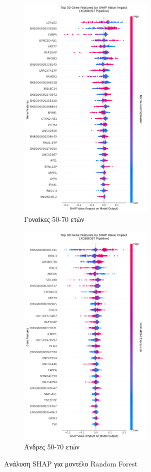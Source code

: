 \documentclass[12pt]{report}
\begin{document}
            \begin{figure}[ht]
                \centering
                \begin{subfigure}[b]{0.45\textwidth}
                    \centering
                    \includegraphics[height=11cm,width=\textwidth,keepaspectratio]{ML/Predict/DEG/SHAP/XGBoost/shap_beeswarm_plot_Female_50-70_useSMOTE_False.png}
                    \caption{Γυναίκες 50-70 ετών}
                    \label{fig:shap_beeswarm_XGB_plot_Female_50-70_useSMOTE_False}
                \end{subfigure}
                \hfill
                \begin{subfigure}[b]{0.45\textwidth}
                    \centering
                    \includegraphics[height=11cm,width=\textwidth,keepaspectratio]{ML/Predict/DEG/SHAP/XGBoost/shap_beeswarm_plot_Male_50-70_useSMOTE_False.png}
                    \caption{Άνδρες 50-70 ετών}
                    \label{fig:shap_beeswarm_XGB_plot_Male_50-70_useSMOTE_False}
                \end{subfigure}
                \caption{Ανάλυση SHAP για μοντέλο Random Forest}
                \label{fig:beeswarm-shap-50-70-xgb-classifier}
            \end{figure}
\end{document}
